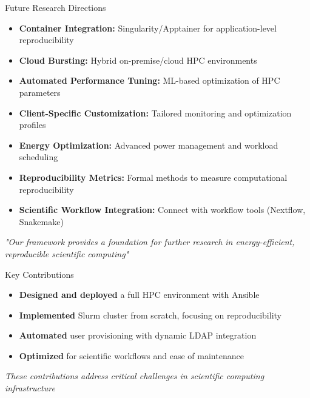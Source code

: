 \documentclass[aspectratio=169]{beamer}
\begin{document}
\begin{frame}{Future Research Directions}
  \begin{itemize}
    \item \textbf{Container Integration:} Singularity/Apptainer for application-level reproducibility
    \item \textbf{Cloud Bursting:} Hybrid on-premise/cloud HPC environments
    \item \textbf{Automated Performance Tuning:} ML-based optimization of HPC parameters
    \item \textbf{Client-Specific Customization:} Tailored monitoring and optimization profiles
    \item \textbf{Energy Optimization:} Advanced power management and workload scheduling
    \item \textbf{Reproducibility Metrics:} Formal methods to measure computational reproducibility
    \item \textbf{Scientific Workflow Integration:} Connect with workflow tools (Nextflow, Snakemake)
  \end{itemize}
  
  \vspace{0.3cm}
  \begin{center}
    \textit{"Our framework provides a foundation for further research in energy-efficient, reproducible scientific computing"}
  \end{center}
\end{frame}

\begin{frame}{Key Contributions}
  \begin{itemize}
    \item \textbf{Designed and deployed} a full HPC environment with Ansible
    \item \textbf{Implemented} Slurm cluster from scratch, focusing on reproducibility
    \item \textbf{Automated} user provisioning with dynamic LDAP integration
    \item \textbf{Optimized} for scientific workflows and ease of maintenance
  \end{itemize}
  
  \vspace{0.3cm}
  \begin{center}
    \textit{These contributions address critical challenges in scientific computing infrastructure}
  \end{center}
\end{frame}
\end{document}

